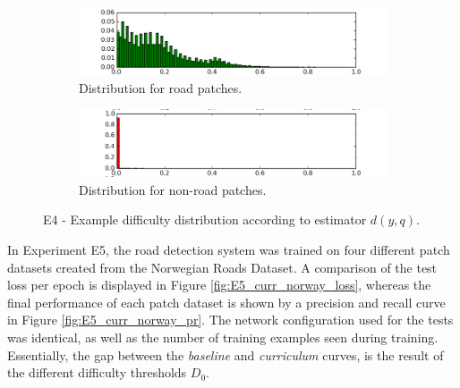 \begin{figure}
\begin{subfigure}{0.5\textwidth}
\includegraphics[width=\linewidth]{figs/E4/E4-road-dist.png}
\caption{Distribution for road patches.} \label{fig:E4_difficulty_distribution_road}
\end{subfigure}
\hspace*{\fill} %
\begin{subfigure}{0.5\textwidth}
\includegraphics[width=\linewidth]{figs/E4/E4-non_road-dist.png}
\caption{Distribution for non-road patches.} \label{fig:E4_difficulty_distribution_nonroad}
\end{subfigure}
\hspace*{\fill} %
\caption[E4 - Difficulty distribution]{E4 - Example difficulty distribution according to estimator $d(y,q)$. } \label{fig:E4_difficulty_distribution}
\end{figure}

In Experiment E5, the road detection system was trained on four different patch datasets created from the Norwegian Roads Dataset. A comparison of the test loss per epoch is displayed in Figure \ref{fig:E5_curr_norway_loss}, whereas the final performance of each patch dataset is shown by a precision and recall curve in Figure \ref{fig:E5_curr_norway_pr}. The network configuration used for the tests was identical, as well as the number of training examples seen during training. Essentially, the gap between the \textit{baseline} and \textit{curriculum} curves, is the result of the different difficulty thresholds $D_0$.\\

